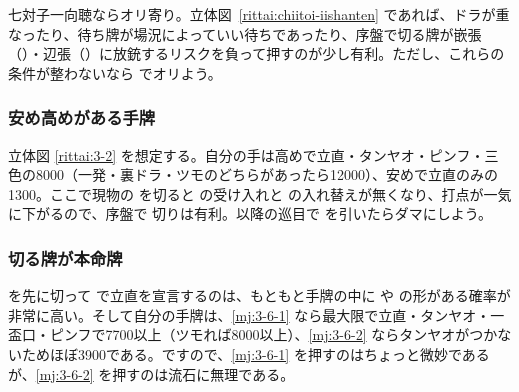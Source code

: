 \documentclass[../nankiru_main.tex]{subfiles}
\begin{document}
七対子一向聴ならオリ寄り。立体図~\ref{rittai:chiitoi-iishanten} であれば、ドラが重なったり、待ち牌が場況によっていい待ちであったり、序盤で切る牌が嵌張（）・辺張（）に放銃するリスクを負って押すのが少し有利。ただし、これらの条件が整わないなら  でオリよう\citep[][pp. 50--55]{tetsuoshi}。

\begin{rittai}[hbt]
  \centering
  
  
  \caption{序盤で自分の手牌が七対子一向聴の場合}
  \label{rittai:chiitoi-iishanten}
\end{rittai}


\subsubsection*{安め高めがある手牌}

立体図 \ref{rittai:3-2} を想定する。自分の手は高めで立直・タンヤオ・ピンフ・三色の8000（一発・裏ドラ・ツモのどちらがあったら12000）、安めで立直のみの1300。ここで現物の  を切ると  の受け入れと  の入れ替えが無くなり、打点が一気に下がるので、序盤で  切りは有利。以降の巡目で  を引いたらダマにしよう\citep[][pp. 62--65]{tetsuoshi}。

\begin{rittai}[hbt]
  \centering
  
  
  \caption{序盤で手牌の価値の範囲が大きい場合}
  \label{rittai:3-2}
\end{rittai}


\subsubsection*{切る牌が本命牌}

 を先に切って  で立直を宣言するのは、もともと手牌の中に  や  の形がある確率が非常に高い。そして自分の手牌は、\ref{mj:3-6-1} なら最大限で立直・タンヤオ・一盃口・ピンフで7700以上（ツモれば8000以上）、\ref{mj:3-6-2} ならタンヤオがつかないためほぼ3900である。ですので、\ref{mj:3-6-1} を押すのはちょっと微妙であるが、\ref{mj:3-6-2} を押すのは流石に無理である\citep[][pp.~66--73]{tetsuoshi}。
\end{document}
